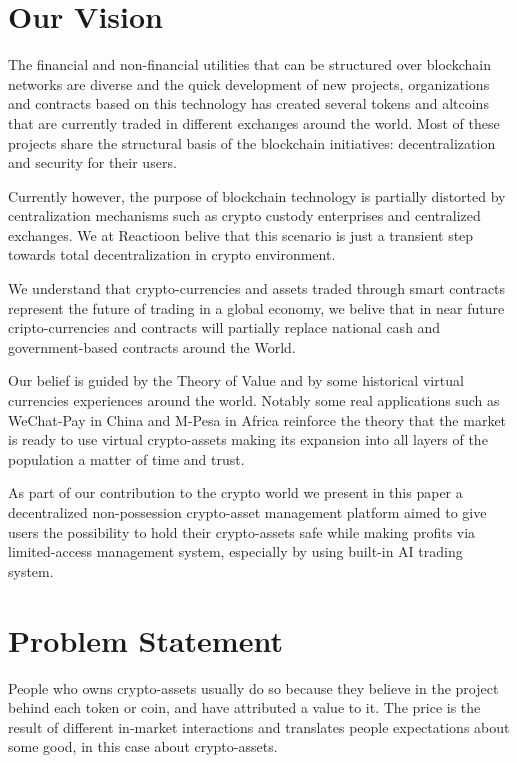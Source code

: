 \documentclass[
	article,			%
	12pt,				%
	oneside,			%
	a4paper,			%
	brazil,				%
	english,
	sumario=tradicional
	]{abntex2}
\begin{document}
\section{Our Vision}
The financial and non-financial utilities that can be structured over blockchain networks are diverse and the quick development of new projects, organizations and contracts based on this technology has created several tokens and altcoins that are currently traded in different exchanges around the world. Most of these projects share the structural basis of the blockchain initiatives: decentralization and security for their users. 

Currently however, the purpose of blockchain technology is partially distorted by centralization mechanisms such as crypto custody enterprises and centralized exchanges. We at Reactioon belive that this scenario is just a transient step towards total decentralization in crypto environment. 

We understand that crypto-currencies and assets traded through smart contracts represent the future of trading in a global economy, we belive that in near future cripto-currencies and contracts will partially replace national cash and government-based contracts around the World. 

Our belief is guided by the Theory of Value and by some historical virtual currencies experiences around the world. Notably some real applications such as WeChat-Pay in China and M-Pesa in Africa reinforce the theory that the market is ready to use virtual crypto-assets making its expansion into all layers of the population  a matter of time and trust.

As part of our contribution to the crypto world we present in this paper a decentralized non-possession crypto-asset management platform aimed to give users the possibility to hold their crypto-assets safe while making profits via limited-access management system, especially by using built-in AI trading system.


\section{Problem Statement}

People who owns crypto-assets usually do so because they believe in the project behind each token or coin, and have attributed a value to it. The price is the result of different in-market interactions and translates people expectations about some good, in this case about crypto-assets.
\end{document}
